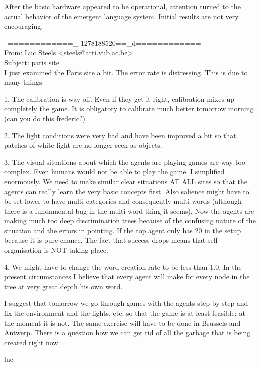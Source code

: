 After the basic hardware appeared to be operational, attention turned to the actual behavior of the 
emergent language system. Initial results are not very encouraging. 

\begin{mail}
--============\_-1278188520==\_d============\\
From: Luc Steels <steels@arti.vub.ac.be>\\
Subject: paris site \\

I just examined the Paris site a bit. The error rate is
distressing. This is due to many things.

1. The calibration is way off. Even if they get it
right, calibration mixes up completely the game.
It is obligatory to calibrate much better tomorrow
morning (can you do this frederic?)

2. The light conditions were very bad and have been improved a bit so that 
patches of white light are no longer seen as objects.

3. The visual situations about which the agents are playing games
are way too complex. Even humans would not be able to play the game. I simplified
enormously. We need to make similar clear situations AT ALL sites so that the 
agents can really learn the very basic concepts first. Also salience
might have to be set lower to have multi-categories and consequently multi-words
(although there is a fundamental bug in the multi-word thing it seems). Now the
agents are making much too deep discrimination trees because of the confusing 
nature of the situation and the errors in pointing. If the top agent 
only has 20 %
in the setup because it is pure chance. The fact that success drops means 
that self-organisation is NOT taking place.

4. We might have to change the word creation rate to be less than 1.0. 
In the present circumstances I believe that every agent will make for every node
in the tree at very great depth his own word.

I suggest that tomorrow we go through games with the agents step by step and fix 
the environment and the lights, etc. so that the game is at least feasible; at the 
moment it is not. The same exercise will have to be done in Brussels and Antwerp. 
There is a question how we can get rid of all the garbage that is being created right now.

luc
\end{mail}

